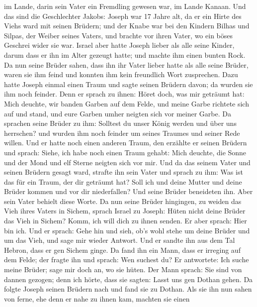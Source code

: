 im Lande, darin sein Vater ein Fremdling gewesen war, im Lande Kanaan.
 Und das sind die Geschlechter Jakobs: Joseph war 17 Jahre
alt, da er ein Hirte des Viehs ward mit seinen Brüdern; und der Knabe
war bei den Kindern Bilhas und Silpas, der Weiber seines Vaters, und
brachte vor ihren Vater, wo ein böses Geschrei wider sie war.
 Israel aber hatte Joseph lieber als alle seine Kinder,
darum dass er ihn im Alter gezeugt hatte; und machte ihm einen bunten
Rock.  Da nun seine Brüder sahen, dass ihn ihr Vater lieber
hatte als alle seine Brüder, waren sie ihm feind und konnten ihm kein
freundlich Wort zusprechen.  Dazu hatte Joseph einmal einen
Traum und sagte seinen Brüdern davon; da wurden sie ihm noch feinder.
 Denn er sprach zu ihnen: Höret doch, was mir geträumt hat:
 Mich deuchte, wir banden Garben auf dem Felde, und meine
Garbe richtete sich auf und stand, und eure Garben umher neigten sich
vor meiner Garbe.  Da sprachen seine Brüder zu ihm: Solltest
du unser König werden und über uns herrschen? und wurden ihm noch
feinder um seines Traumes und seiner Rede willen.  Und er
hatte noch einen anderen Traum, den erzählte er seinen Brüdern und
sprach: Siehe, ich habe noch einen Traum gehabt: Mich deuchte, die Sonne
und der Mond und elf Sterne neigten sich vor mir.  Und da
das seinem Vater und seinen Brüdern gesagt ward, strafte ihn sein Vater
und sprach zu ihm: Was ist das für ein Traum, der dir geträumt hat? Soll
ich und deine Mutter und deine Brüder kommen und vor dir niederfallen?
 Und seine Brüder beneideten ihn. Aber sein Vater behielt
diese Worte.  Da nun seine Brüder hingingen, zu weiden das
Vieh ihres Vaters in Sichem,  sprach Israel zu Joseph:
Hüten nicht deine Brüder das Vieh in Sichem? Komm, ich will dich zu
ihnen senden. Er aber sprach: Hier bin ich.  Und er sprach:
Gehe hin und sieh, ob's wohl stehe um deine Brüder und um das Vieh, und
sage mir wieder Antwort. Und er sandte ihn aus dem Tal Hebron, dass er
gen Sichem ginge.  Da fand ihn ein Mann, dass er irreging
auf dem Felde; der fragte ihn und sprach: Wen suchest du? 
Er antwortete: Ich suche meine Brüder; sage mir doch an, wo sie hüten.
 Der Mann sprach: Sie sind von dannen gezogen; denn ich
hörte, dass sie sagten: Lasst uns gen Dothan gehen. Da folgte Joseph
seinen Brüdern nach und fand sie zu Dothan.  Als sie ihn
nun sahen von ferne, ehe denn er nahe zu ihnen kam, machten sie einen
